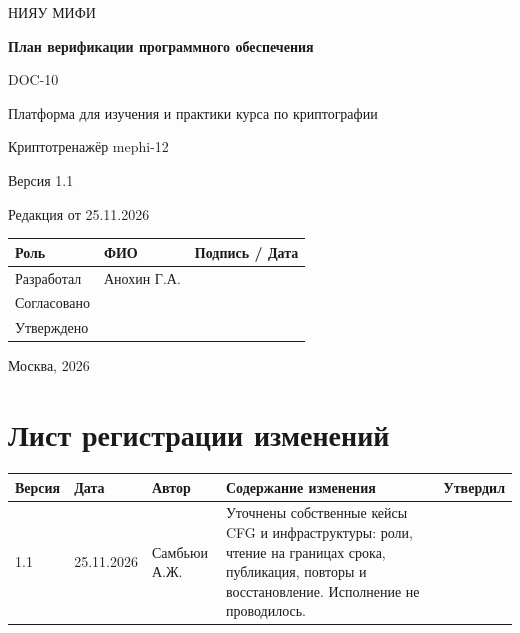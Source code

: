 \documentclass[12pt,a4paper]{article}
\begin{document}
\hypersetup{pageanchor=false}
\begin{titlepage}
  \thispagestyle{empty}
  \centering
  {\large НИЯУ МИФИ\par}
  \vspace*{3.5cm}
  {\LARGE\bfseries План верификации программного обеспечения\par}
  \vspace{0.5cm}
  {\large DOC-10\par}
  \vspace{0.6cm}
  {\large Платформа для изучения и практики курса по криптографии\par}
  {\large Криптотренажёр mephi-12\par}
  \vspace{0.7cm}
  {\large Версия 1.1\par}
  {\large Редакция от 25.11.2026\par}
  \vspace{1cm}
  \begin{tabularx}{\textwidth}{@{}p{3.4cm}Xp{4cm}@{}}
    \toprule
    Роль & ФИО & Подпись / Дата \\
    \midrule
    Разработал & Анохин Г.А. & \\
    \addlinespace[6pt]
    Согласовано & & \\
    \addlinespace[6pt]
    Утверждено & & \\
    \bottomrule
  \end{tabularx}
  \vfill
  {\large Москва, 2026\par}
\end{titlepage}
\hypersetup{pageanchor=true}

\section*{Лист регистрации изменений}
\begingroup\small\singlespacing
\noindent
\begin{tabularx}{\textwidth}{@{}p{1.2cm}p{2cm}p{2.5cm}Xp{1.8cm}@{}}
\toprule
Версия & Дата & Автор & Содержание изменения & Утвердил \\
\midrule
1.1 & 25.11.2026 & Самбьюи А.Ж. & Уточнены собственные кейсы CFG и инфраструктуры: роли, чтение на границах срока, публикация, повторы и восстановление. Исполнение не проводилось. & \\
\bottomrule
\end{tabularx}
\endgroup
\clearpage
\begingroup\small\singlespacing
\tableofcontents
\endgroup
\clearpage
\end{document}
